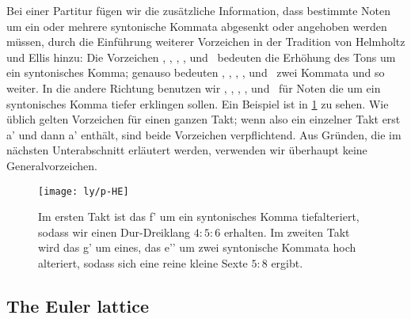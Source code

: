 \documentclass[british,11pt]{scrartcl}
\begin{document}
Bei einer Partitur fügen wir die zusätzliche Information, dass bestimmte Noten
um ein oder mehrere syntonische Kommata abgesenkt oder angehoben werden müssen,
durch die Einführung weiterer Vorzeichen in der Tradition von Helmholtz und
Ellis \cite{HE} hinzu: Die Vorzeichen \dsharpp, \sharpp, \naturalp, \flatp, und
\dflatp\ bedeuten die Erhöhung des Tons um ein syntonisches Komma; genauso
bedeuten \dsharpp, \sharppp, \naturalpp, \flatpp, und \dflatpp\ zwei Kommata und
so weiter. In die andere Richtung benutzen wir \dsharpm, \sharpm, \naturalm,
\flatm, und \dflatm\ für Noten die um ein syntonisches Komma tiefer erklingen
sollen. Ein Beispiel ist in \cref{fig:HE} zu sehen. Wie üblich gelten Vorzeichen
für einen ganzen Takt; wenn also ein einzelner Takt erst \naturalm a' und dann
\natural a' enthält, sind beide Vorzeichen verpflichtend. Aus Gründen, die im
nächsten Unterabschnitt erläutert werden, verwenden wir überhaupt keine
Generalvorzeichen.

\begin{figure}\centering
  \texttt{[image: ly/p-HE]}
  \caption{Im ersten Takt ist das \sharp f’ um ein syntonisches Komma 
    tiefalteriert, sodass wir einen Dur-Dreiklang $4:5:6$ erhalten. Im zweiten
    Takt wird das g’ um eines, das \flat e’’ um zwei syntonische Kommata hoch
    alteriert, sodass sich eine reine kleine Sexte $5:8$ ergibt.}\label{fig:HE}
\end{figure}

\subsection{The Euler lattice}
\end{document}
